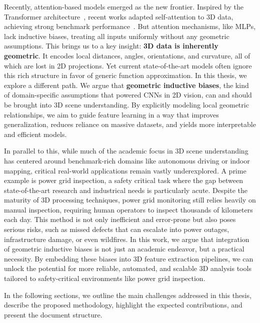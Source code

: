 Recently, attention-based models emerged as the new frontier. Inspired by the
Transformer architecture~\cite{vaswani2017attention}, recent works adapted
self-attention to 3D data, achieving strong benchmark
performance~\cite{zhao2021point,wu2022point,lai2022stratified,park2022fast,wang2023octformer,lai2023spherical,wu2023ptv3}.
But attention mechanisms, like MLPs, lack inductive biases, treating all inputs
uniformly without any geometric assumptions.
%
This brings us to a key insight: \textbf{3D data is inherently geometric}. It
encodes local distances, angles, orientations, and curvature, all of which are
lost in 2D projections. Yet current state-of-the-art models often ignore this
rich structure in favor of generic function approximation.
%
In this thesis, we explore a different path. We argue that \textbf{geometric
    inductive biases}, the kind of domain-specific assumptions that powered CNNs in
2D vision, can and should be brought into 3D scene understanding. By explicitly
modeling local geometric relationships, we aim to guide feature learning in a
way that improves generalization, reduces reliance on massive datasets, and
yields more interpretable and efficient models.

In parallel to this, while much of the academic focus in 3D scene understanding
has centered around benchmark-rich domains like autonomous driving or indoor
mapping, critical real-world applications remain vastly underexplored.
%
A prime example is power grid inspection, a safety critical task where the gap
between state-of-the-art research and industrical needs is particularly acute.
%
Despite the maturity of 3D processing techniques, power grid monitoring still
relies heavily on manual inspection, requiring human operators to inspect
thousands of kilometers each day. This method is not only inefficient and
error-prone but also poses serious risks, such as missed defects that can
escalate into power outages, infrastructure damage, or even wildfires.
%
In this work, we argue that integration of geometric inductive biases is not
just an academic endeavor, but a practical necessity. By embedding these biases
into 3D feature extraction pipelines, we can unlock the potential for more
reliable, automated, and scalable 3D analysis tools tailored to safety-critical
environments like power grid inspection.

In the following sections, we outline the main challenges addressed in this
thesis, describe the proposed methodology, highlight the expected
contributions, and present the document structure.

